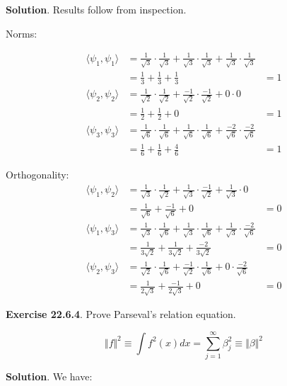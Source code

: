 \textbf{Solution}. Results follow from inspection.

Norms:

\begin{align*}
\langle \psi_{1}, \psi_{1} \rangle &= \frac{1}{\sqrt{3}} \cdot \frac{1}{\sqrt{3}} + \frac{1}{\sqrt{3}} \cdot \frac{1}{\sqrt{3}} + \frac{1}{\sqrt{3}} \cdot \frac{1}{\sqrt{3}} \\&= \frac{1}{3} + \frac{1}{3} + \frac{1}{3} &= 1 \\
\langle \psi_{2}, \psi_{2} \rangle &= \frac{1}{\sqrt{2}} \cdot \frac{1}{\sqrt{2}} + \frac{-1}{\sqrt{2}} \cdot \frac{-1}{\sqrt{2}} + 0 \cdot 0 \\&= \frac{1}{2} + \frac{1}{2} + 0 &= 1 \\
\langle \psi_{3}, \psi_{3} \rangle &= \frac{1}{\sqrt{6}} \cdot \frac{1}{\sqrt{6}} + \frac{1}{\sqrt{6}} \cdot \frac{1}{\sqrt{6}} + \frac{-2}{\sqrt{6}} \cdot \frac{-2}{\sqrt{6}}\\ &= \frac{1}{6} + \frac{1}{6} + \frac{4}{6} &= 1
\end{align*}

Orthogonality: \begin{align*}
\langle \psi_{1}, \psi_{2} \rangle &= \frac{1}{\sqrt{3}} \cdot \frac{1}{\sqrt{2}} + \frac{1}{\sqrt{3}} \cdot \frac{-1}{\sqrt{2}} + \frac{1}{\sqrt{3}} \cdot 0 \\&= \frac{1}{\sqrt{6}} + \frac{-1}{\sqrt{6}} + 0 &= 0 \\
\langle \psi_{1}, \psi_{3} \rangle &= \frac{1}{\sqrt{3}} \cdot \frac{1}{\sqrt{6}} + \frac{1}{\sqrt{3}} \cdot \frac{1}{\sqrt{6}} + \frac{1}{\sqrt{3}} \cdot \frac{-2}{\sqrt{6}} \\&= \frac{1}{3\sqrt{2}} + \frac{1}{3\sqrt{2}} + \frac{-2}{3\sqrt{2}} &= 0 \\
\langle \psi_{2}, \psi_{3} \rangle &= \frac{1}{\sqrt{2}} \cdot \frac{1}{\sqrt{6}} + \frac{-1}{\sqrt{2}} \cdot \frac{1}{\sqrt{6}} + 0 \cdot \frac{-2}{\sqrt{6}} \\&= \frac{1}{2\sqrt{3}} + \frac{-1}{2\sqrt{3}} + 0 &= 0 
\end{align*}

\textbf{Exercise 22.6.4}. Prove Parseval's relation equation.

\[ \Vert f \Vert^{2} \equiv \int f^{2}(x) dx = \sum_{j=1}^{\infty} \beta_{j}^{2} \equiv \Vert \beta \Vert^{2}\]

\textbf{Solution}. We have:

